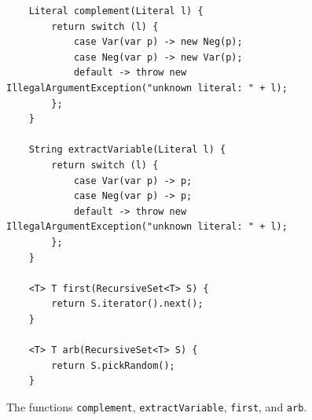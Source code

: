 \begin{figure}[!ht]
  \centering
\begin{verbatim}
    Literal complement(Literal l) {
        return switch (l) {
            case Var(var p) -> new Neg(p);
            case Neg(var p) -> new Var(p);
            default -> throw new IllegalArgumentException("unknown literal: " + l);
        };
    }

    String extractVariable(Literal l) {
        return switch (l) {
            case Var(var p) -> p;
            case Neg(var p) -> p;
            default -> throw new IllegalArgumentException("unknown literal: " + l);
        };
    }

    <T> T first(RecursiveSet<T> S) {
        return S.iterator().next();
    }

    <T> T arb(RecursiveSet<T> S) {
        return S.pickRandom();
    }
\end{verbatim}
\vspace*{-0.3cm}
  \caption{The functions \texttt{complement}, \texttt{extractVariable}, \texttt{first}, and \texttt{arb}.}
  \label{fig:solve-aux}
\end{figure}

